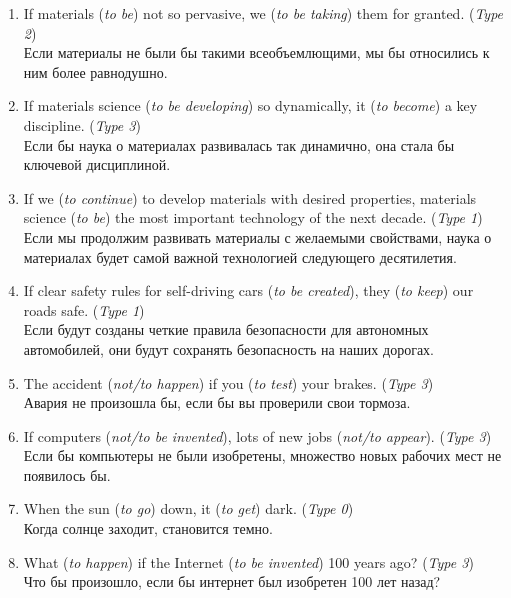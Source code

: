 \begin{enumerate}
      \item If materials (\textit{to be}) not so pervasive, we (\textit{to be taking}) them for granted. (\textit{Type 2})\\
            Если материалы не были бы такими всеобъемлющими, мы бы относились к ним более равнодушно.

      \item If materials science (\textit{to be developing}) so dynamically, it (\textit{to become}) a key discipline. (\textit{Type 3})\\
            Если бы наука о материалах развивалась так динамично, она стала бы ключевой дисциплиной.

      \item If we (\textit{to continue}) to develop materials with desired properties, materials science (\textit{to be}) the most important technology of the next decade. (\textit{Type 1})\\
            Если мы продолжим развивать материалы с желаемыми свойствами, наука о материалах будет самой важной технологией следующего десятилетия.

      \item If clear safety rules for self-driving cars (\textit{to be created}), they (\textit{to keep}) our roads safe. (\textit{Type 1})\\
            Если будут созданы четкие правила безопасности для автономных автомобилей, они будут сохранять безопасность на наших дорогах.

      \item The accident (\textit{not/to happen}) if you (\textit{to test}) your brakes. (\textit{Type 3})\\
            Авария не произошла бы, если бы вы проверили свои тормоза.

      \item If computers (\textit{not/to be invented}), lots of new jobs (\textit{not/to appear}). (\textit{Type 3})\\
            Если бы компьютеры не были изобретены, множество новых рабочих мест не появилось бы.

      \item When the sun (\textit{to go}) down, it (\textit{to get}) dark. (\textit{Type 0})\\
            Когда солнце заходит, становится темно.

      \item What (\textit{to happen}) if the Internet (\textit{to be invented}) 100 years ago? (\textit{Type 3})\\
            Что бы произошло, если бы интернет был изобретен 100 лет назад?


\end{enumerate}
